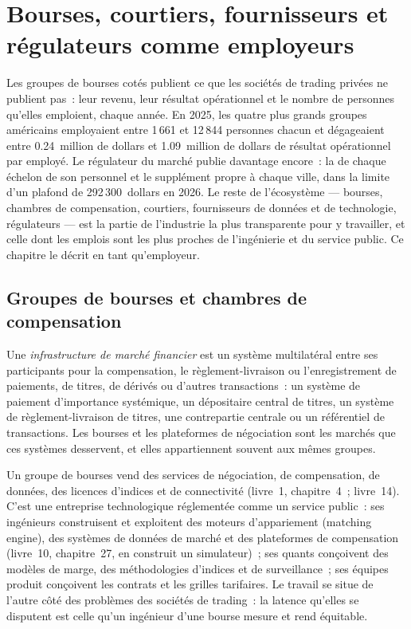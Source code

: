 \chapter{Bourses, courtiers, fournisseurs et régulateurs comme employeurs}\label{ch:in:exchanges-brokers-vendors-and-regulators-as-employers}

Les groupes de bourses cotés publient ce que les sociétés de trading privées ne publient pas~: leur revenu, leur résultat opérationnel et le nombre
de personnes qu'elles emploient, chaque année. En 2025, les quatre plus grands groupes américains employaient entre 1\,661 et 12\,844 personnes chacun et
dégageaient entre 0.24~million de dollars et 1.09~million de dollars de résultat opérationnel par employé. Le régulateur du marché publie
davantage encore~: la  de chaque échelon de son personnel et le supplément propre à chaque ville, dans la limite d'un plafond de 292\,300~dollars en 2026.
Le reste de l'écosystème --- bourses, chambres de compensation, courtiers, fournisseurs de données et de technologie, régulateurs --- est
la partie de l'industrie la plus transparente pour y travailler, et celle dont les emplois sont les plus proches de l'ingénierie et du service public. Ce
chapitre le décrit en tant qu'employeur.

\section{Groupes de bourses et chambres de compensation}

\begin{definition}\label{def:in:exchanges-brokers-vendors-and-regulators-as-employers:fmi}
Une \emph{infrastructure de marché financier} est un système multilatéral entre ses
participants pour la compensation, le règlement-livraison ou l'enregistrement de paiements, de titres, de dérivés ou d'autres transactions~: un
système de paiement d'importance systémique, un dépositaire central de titres, un système de règlement-livraison de titres, une
contrepartie centrale ou un référentiel de transactions. Les bourses et les plateformes de négociation sont les marchés que ces systèmes desservent, et elles appartiennent souvent
aux mêmes groupes.
\end{definition}

Un groupe de bourses vend des services de négociation, de compensation, de données, des licences d'indices et de connectivité (livre~1, chapitre~4~; livre~14). C'est une
entreprise technologique réglementée comme un service public~: ses ingénieurs construisent et exploitent des moteurs d'appariement (matching engine), des systèmes de données de marché et
des plateformes de compensation (livre~10, chapitre~27, en construit un simulateur)~; ses quants conçoivent des modèles de marge, des méthodologies d'indices
et de surveillance~; ses équipes produit conçoivent les contrats et les grilles tarifaires. Le travail se situe de l'autre côté des
problèmes des sociétés de trading~: la latence qu'elles se disputent est celle qu'un ingénieur d'une bourse mesure et rend équitable.

